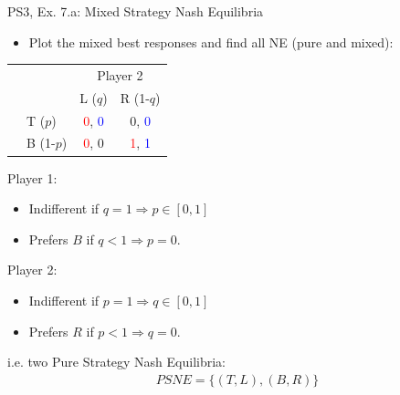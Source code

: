 \begin{frame}{PS3, Ex. 7.a: Mixed Strategy Nash Equilibria}
  \begin{multicols}{2}
    \begin{itemize}
      \item[(a)] Plot the mixed best responses and find all NE (pure and mixed):
    \end{itemize}
    \begin{table}
      \begin{tabular}{cl|c|c|}
        & \multicolumn{1}{c}{} & \multicolumn{2}{c}{\color{blue}Player 2}\\
        \parbox[t]{1mm}{}
          &  &  &  \\
          & T  ($p$)  & \textcolor{red}{0}, \textcolor{blue}{0} & 0, \textcolor{blue}{0} \\
          & B  (1-$p$)& \textcolor{red}{0}, 0 & \textcolor{red}{1}, \textcolor{blue}{1} \\
      \end{tabular}
    \end{table}
    Player 1:
    \begin{itemize}
      \item Indifferent if $q=1\Rightarrow p\in[0,1]$
      \item Prefers $B$ if $q<1\Rightarrow p=0$.
    \end{itemize}
    Player 2:
    \begin{itemize}
      \item Indifferent if $p=1\Rightarrow q\in[0,1]$
      \item Prefers $R$ if $p<1\Rightarrow q=0$.
    \end{itemize}
    i.e. two Pure Strategy Nash Equilibria:
    \begin{align*}
      PSNE=\{(T,L),(B,R)\}
    \end{align*}
  \vfill\null \columnbreak

\end{multicols}
\end{frame}

